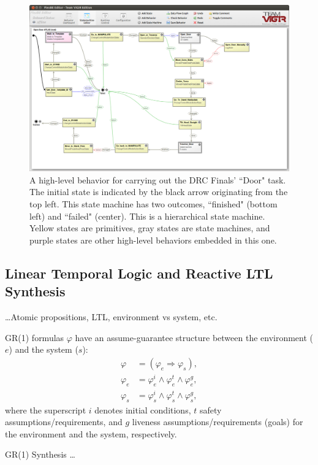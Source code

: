 \begin{figure}[t]
\centering
\includegraphics[width=0.99\columnwidth,clip]{./img/behavior_open_door.png}
\caption{A high-level behavior for carrying out the DRC Finals' ``Door" task.
The initial state is indicated by the black arrow originating from the top left.
This state machine has two outcomes, ``finished" (bottom left) and ``failed" (center).
This is a hierarchical state machine.
Yellow states are primitives, gray states are state machines, and purple states are other high-level behaviors embedded in this one.
}
\label{Fig:FlexBESM}
\end{figure}

\subsection{Linear Temporal Logic and Reactive LTL Synthesis}

\ldots Atomic propositions, LTL, environment vs system, etc.

GR(1) formulas $\varphi$ have an assume-guarantee structure between the environment ($e$) and the system ($s$):
\begin{equation}\label{GR1Formula}
\begin{split}
	\varphi &= (\varphi_e \Rightarrow \varphi_s),\\
	\varphi_e &= \varphi_e^i \wedge \varphi_e^t \wedge \varphi_e^g,\\
	\varphi_s &= \varphi_s^i \wedge \varphi_s^t \wedge \varphi_s^g,
\end{split}
\end{equation}
where the superscript $i$ denotes initial conditions, $t$ safety assumptions/requirements, and $g$ liveness assumptions/requirements (goals) for the environment and the system, respectively. 

GR(1) Synthesis \cite{piterman_06} \ldots

